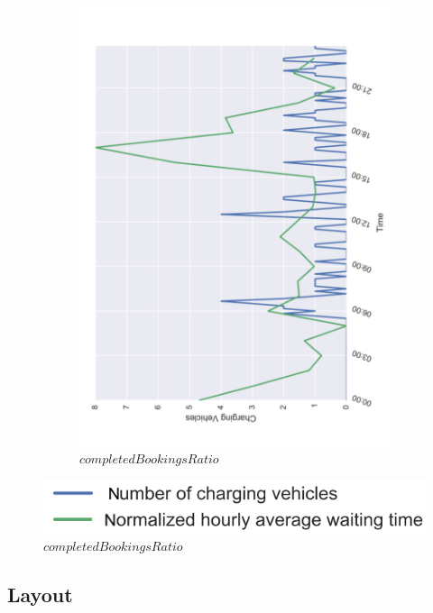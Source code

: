 \documentclass[12pt,a4paper]{article}
\begin{document}
\begin{figure}
{\begin{subfigure}[b]{0.458\textwidth}
  \includegraphics[width=\linewidth]{./images/charge2}
  \caption{$completedBookingsRatio$}
  \label{cbr}
\end{subfigure}
}
\begin{center}
\vspace{-0.5em}
\includegraphics[scale=0.35]{./images/labels}
\end{center}

\label{sendtocharge}
\end{figure}

\subsection{Layout}
\end{document}
